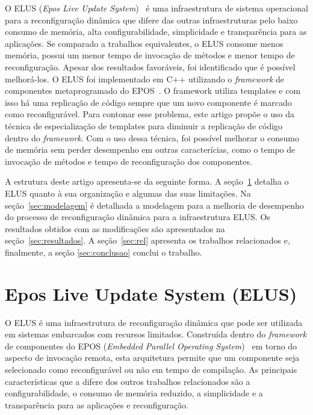 \documentclass[12pt]{article}
\begin{document}
O ELUS (\textit{Epos Live Update System})~\cite{gracioli2009elus} é uma infraestrutura de sistema operacional para a reconfiguração dinâmica que difere das outras infraestruturas pelo baixo consumo de memória, alta configurabilidade, simplicidade e transparência para as aplicações. Se comparado a trabalhos equivalentes, o ELUS consome menos memória, possui um menor tempo de invocação de métodos e menor tempo de reconfiguração. Apesar dos resultados favoráveis, foi identificado que é possível melhorá-los. O ELUS foi implementado em C++ utilizando o \textit{framework}  de componentes metaprogramado do EPOS~\cite{Froehlich:2001}. O framework utiliza templates e com isso há uma replicação de código sempre que um novo componente é marcado como reconfigurável. Para contonar esse problema, este artigo propõe o uso da técnica de especialização de templates para diminuir a replicação de código dentro do \textit{framework}. Com o uso dessa técnica, foi possível melhorar o consumo de memória sem perder desempenho em outras caracterícias, como o tempo de invocação de métodos e tempo de reconfiguração dos componentes.

A estrutura deste artigo apresenta-se da seguinte forma. A seção~\ref{sec:elus} detalha o ELUS quanto à sua organização e algumas das suas limitações. Na seção~\ref{sec:modelagem} é detalhada a modelagem para a melhoria de desempenho do processo de reconfiguração dinâmica para a infraestrutura ELUS. Os resultados obtidos com as modificações são apresentados na seção~\ref{sec:resultados}. A seção~\ref{sec:rel} apresenta os trabalhos relacionados e, finalmente, a seção \ref{sec:conclusao} conclui o trabalho.

\section{Epos Live Update System (ELUS)}
\label{sec:elus}
O ELUS é uma infraestrutura de reconfiguração dinâmica que pode ser utilizada em sistemas embarcados com recursos limitados. Construída dentro do \textit{framework} de componentes do EPOS (\textit{Embedded Parallel Operating System})~\cite{Froehlich:2001} em torno do aspecto de invocação remota, esta arquitetura permite que um componente seja selecionado como reconfigurável ou não em tempo de compilação. As principais características que a difere dos outros trabalhos relacionados são a configurabilidade, o consumo de memória reduzido, a simplicidade e a transparência para as aplicações e reconfiguração.
\end{document}
